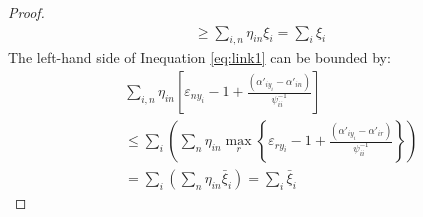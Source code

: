 \begin{proof}
\begin{eqnarray}
 \ge \sum\limits_{i,n} {{\eta _{in}}{\xi _i}}  = \sum\limits_i {{\xi _i}} 
\end{eqnarray}
The left-hand side of Inequation \eqref{eq:link1} can be bounded by:
\begin{eqnarray}
&&\sum\limits_{i,n} {{\eta _{in}}\left[ { {\varepsilon _{n{y_i}}}-1 + \frac{{\left( {{{\alpha '}_{i{y_i}}} - {{\alpha '}_{in}}} \right)}}{{\psi_{ii}^{ - 1}}}} \right]} \nonumber\\ &&\le \sum\limits_i {\left( {\sum\limits_n {{\eta _{in}}\mathop {\max }\limits_r \left\{ { {\varepsilon _{r{y_i}}} -1 + \frac{{\left( {{{\alpha '}_{i{y_i}}} - {{\alpha '}_{ir}}} \right)}}{{\psi_{ii}^{ - 1}}}} \right\}} } \right)}  \nonumber\\
&&= \sum\limits_i {\left( {\sum\limits_n {{\eta _{in}}{{\bar \xi }_i}} } \right)}  = \sum\limits_i {\bar \xi_i }
\end{eqnarray}
\end{proof}